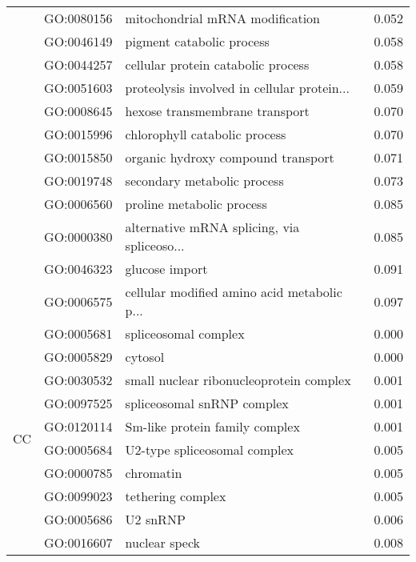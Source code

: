 \begin{longtable}{lllr}
   & GO:0080156 &              mitochondrial mRNA modification &         0.052 \\
   & GO:0046149 &                    pigment catabolic process &         0.058 \\
   & GO:0044257 &           cellular protein catabolic process &         0.058 \\
   & GO:0051603 &  proteolysis involved in cellular protein... &         0.059 \\
   & GO:0008645 &               hexose transmembrane transport &         0.070 \\
   & GO:0015996 &                chlorophyll catabolic process &         0.070 \\
   & GO:0015850 &           organic hydroxy compound transport &         0.071 \\
   & GO:0019748 &                  secondary metabolic process &         0.073 \\
   & GO:0006560 &                    proline metabolic process &         0.085 \\
   & GO:0000380 &  alternative mRNA splicing, via spliceoso... &         0.085 \\
   & GO:0046323 &                               glucose import &         0.091 \\
   & GO:0006575 &  cellular modified amino acid metabolic p... &         0.097 \\
\cline{1-4}
\multirow{21}{*}{CC} & GO:0005681 &                         spliceosomal complex &         0.000 \\
   & GO:0005829 &                                      cytosol &         0.000 \\
   & GO:0030532 &      small nuclear ribonucleoprotein complex &         0.001 \\
   & GO:0097525 &                   spliceosomal snRNP complex &         0.001 \\
   & GO:0120114 &               Sm-like protein family complex &         0.001 \\
   & GO:0005684 &                 U2-type spliceosomal complex &         0.005 \\
   & GO:0000785 &                                    chromatin &         0.005 \\
   & GO:0099023 &                            tethering complex &         0.005 \\
   & GO:0005686 &                                     U2 snRNP &         0.006 \\
   & GO:0016607 &                                nuclear speck &         0.008 \\

\end{longtable}

